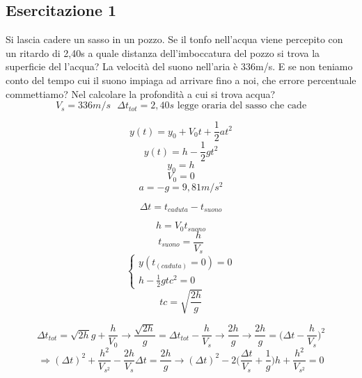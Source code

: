 \documentclass{book}
\begin{document}
\subsection{Esercitazione 1}
Si lascia cadere un sasso in un pozzo. Se il tonfo nell'acqua viene percepito
con un ritardo di 2,40s a quale distanza dell'imboccatura del pozzo si trova la
superficie del l'acqua? La velocità del suono nell'aria è 336m/s. E se non teniamo conto del tempo cui il suono impiaga ad arrivare fino a noi, che errore percentuale commettiamo? Nel calcolare la profondità a cui si trova acqua?
\begin{equation*}
	V_{s}=336m/s\text{ } \Delta t_{tot}=2,40s \text{ legge oraria del sasso che cade}
\end{equation*}
\begin{multicols}{2}
	\begin{equation*}
		y(t)=y_0+V_0t+\frac{1}{2}at^2
	\end{equation*}
	\begin{equation*}
		y(t)=h-\frac{1}{2}gt^2
	\end{equation*}
	\begin{equation*}
		y_0=h
	\end{equation*}
	\begin{equation*}
		V_0=0
	\end{equation*}
	\begin{equation*}
		a=-g=9,81m/s^2
	\end{equation*}
\end{multicols}
\begin{equation*}
	\Delta t=t_{caduta}-t_{suono}
\end{equation*}
\begin{multicols}{2}
	\begin{equation*}
		h=V_0t_{suono}
	\end{equation*}
	\begin{equation*}
		t_{suono}=\frac{h}{V_s}
	\end{equation*}
	\begin{equation*}
		\begin{cases}
			y(t_{(caduta)}=0)=0 \\
			h-\frac{1}{2}gtc^2=0
		\end{cases}
	\end{equation*}
	\begin{equation*}
		tc=\sqrt{\frac{2h}{g}}
	\end{equation*}
\end{multicols}
\begin{equation*}
	\Delta t_{tot}=\sqrt{2h}{g}+\frac{h}{V_0}\to \frac{\sqrt{2h}}{g}=\Delta t_{tot} - \frac{h}{V_s}\to \frac{2h}{g}\to \frac{2h}{g}=\bigg(\Delta t-\frac{h}{V_s}\bigg)^2
\end{equation*}
\begin{equation*}
	\Rightarrow (\Delta t)^2+\frac{h^2}{V_{s^2}} -\frac{2h}{V_s}\Delta t=\frac{2h}{g}\to (\Delta t)^2-2 \bigg(\frac{\Delta t}{V_s}+\frac{1}{g}\bigg) h+\frac{h^2}{V_{s^2}} =0 
\end{equation*}
\end{document}
